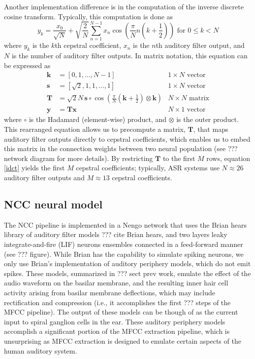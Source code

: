Another implementation difference
is in the computation of
the inverse discrete cosine transform.
Typically, this computation is done as
\begin{equation}
  y_k = \frac{x_0}{\sqrt{N}} + \sqrt{\frac{2}{N}} \sum_{n=1}^{N-1}
  x_n \cos \left( \frac{\pi}{N} n \left( k + \frac{1}{2} \right) \right)
  \text{ for } 0 \le k < N
\end{equation}
where $y_k$ is the $k$th cepstral coefficient,
$x_n$ is the $n$th auditory filter output,
and $N$ is the number of auditory filter outputs.
In matrix notation,
this equation can be expressed as
\begin{align}
  \label{idct}
  \mathbf{k} &= \left[ 0, 1, \ldots, N-1 \right] & 1 \times N \text{ vector} \nonumber \\
  \mathbf{s} &= \left[ \sqrt{2}, 1, 1, \ldots, 1 \right] & 1 \times N \text{ vector} \nonumber \\
  \mathbf{T} &= \sqrt{2}{N} \, \mathbf{s} \circ \cos \left( \frac{\pi}{N} \left(
    \mathbf{k} + \frac{1}{2} \right) \otimes \mathbf{k} \right)
    & N \times N \text{ matrix} \nonumber \\
  \mathbf{y} &= \mathbf{T}\mathbf{x} & N \times 1 \text{ vector}
\end{align}
where $\circ$ is the Hadamard (element-wise) product,
and $\otimes$ is the outer product.
This rearranged equation
allows us to precompute a matrix, $\mathbf{T}$,
that maps auditory filter outputs
directly to cepstral coefficients,
which enables us to embed this matrix
in the connection weights between
two neural population
(see ??? network diagram for more details).
By restricting $\mathbf{T}$
to the first $M$ rows,
equation \eqref{idct} yields the first
$M$ cepstral coefficients;
typically, ASR systems
use $N \approx 26$ auditory filter outputs
and $M \approx 13$ cepstral coefficients.

\subsection{NCC neural model}

The NCC pipeline is implemented
in a Nengo network that uses
the Brian hears library
of auditory filter models
??? cite Brian hears,
and two layers
leaky integrate-and-fire (LIF) neurons ensembles
connected in a feed-forward manner
(see ??? figure).
While Brian has the capability
to simulate spiking neurons,
we only use Brian's implementation of
auditory periphery models,
which do not emit spikes.
These models,
summarized in ??? sect prev work,
emulate the effect of the
audio waveform on the basilar membrane,
and the resulting inner hair cell activity
arising from basilar membrane deflections,
which may include rectification
and compression
(i.e., it accomplishes the first
??? steps of the MFCC pipeline).
The output of these models
can be though of as
the current input
to spiral ganglion cells in the ear.
These auditory periphery models
accomplish a significant portion
of the MFCC extraction pipeline,
which is unsurprising as MFCC extraction
is designed to emulate certain aspects
of the human auditory system.

